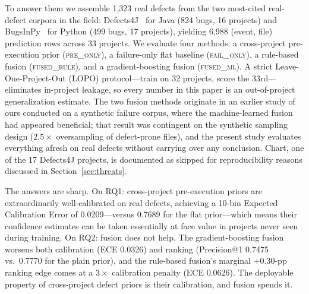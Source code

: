 \documentclass[preprint,12pt]{elsarticle}
\begin{document}
To answer them we assemble 1{,}323 real defects from the two most-cited real-defect corpora in the field: Defects4J~\cite{just2014defects4j} for Java (824 bugs, 16 projects) and BugsInPy~\cite{widyasari2020bugsinpy} for Python (499 bugs, 17 projects), yielding 6{,}988 (event, file) prediction rows across 33 projects. We evaluate four methods: a cross-project pre-execution prior (\textsc{pre\_only}), a failure-only flat baseline (\textsc{fail\_only}), a rule-based fusion (\textsc{fused\_rule}), and a gradient-boosting fusion (\textsc{fused\_ml}). A strict Leave-One-Project-Out (LOPO) protocol---train on 32 projects, score the 33rd---eliminates in-project leakage, so every number in this paper is an out-of-project generalization estimate. The two fusion methods originate in an earlier study of ours conducted on a synthetic failure corpus, where the machine-learned fusion had appeared beneficial; that result was contingent on the synthetic sampling design ($2.5\times$ oversampling of defect-prone files), and the present study evaluates everything afresh on real defects without carrying over any conclusion. Chart, one of the 17 Defects4J projects, is documented as skipped for reproducibility reasons discussed in Section~\ref{sec:threats}.

The answers are sharp. On RQ1: cross-project pre-execution priors are extraordinarily well-calibrated on real defects, achieving a 10-bin Expected Calibration Error of 0.0209---versus 0.7689 for the flat prior---which means their confidence estimates can be taken essentially at face value in projects never seen during training. On RQ2: fusion does not help. The gradient-boosting fusion worsens both calibration (ECE 0.0326) and ranking (Precision@1 0.7475 vs.\ 0.7770 for the plain prior), and the rule-based fusion's marginal $+0.30$-pp ranking edge comes at a $3\times$ calibration penalty (ECE 0.0626). The deployable property of cross-project defect priors is their calibration, and fusion spends it.
\end{document}
